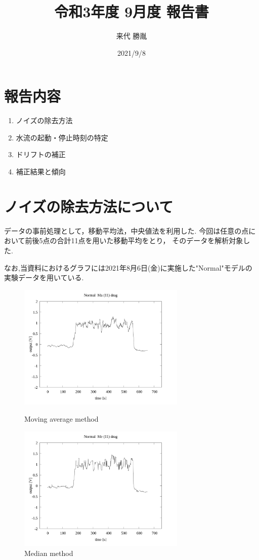 \documentclass[twocolumn,a4j]{jsarticle}
\author{来代 勝胤}
\title{令和3年度 9月度 報告書}
\date{2021/9/8}
\begin{document}
\columnseprule=0.1mm

\maketitle
\section*{報告内容}
\begin{enumerate}[1.]
    \item ノイズの除去方法
    \item 水流の起動・停止時刻の特定
    \item ドリフトの補正
    \item 補正結果と傾向
\end{enumerate}
\section{ノイズの除去方法について}
データの事前処理として，移動平均法，中央値法を利用した.
今回は任意の点において前後5点の合計11点を用いた移動平均をとり，
そのデータを解析対象した.
\par
なお,当資料におけるグラフには2021年8月6日(金)に実施した"Normal"モデルの実験データを用いている.
\begin{figure}[htbp]
    \footnotesize
    \begin{center}
        \includegraphics[width=80mm]{images/Normal_ma(11)_drag_01.png}
        \caption{Moving average method}
        \includegraphics[width=80mm]{images/Normal_me(11)_drag_01.png}
        \caption{Median method}
    \end{center}
\end{figure}
\end{document}
